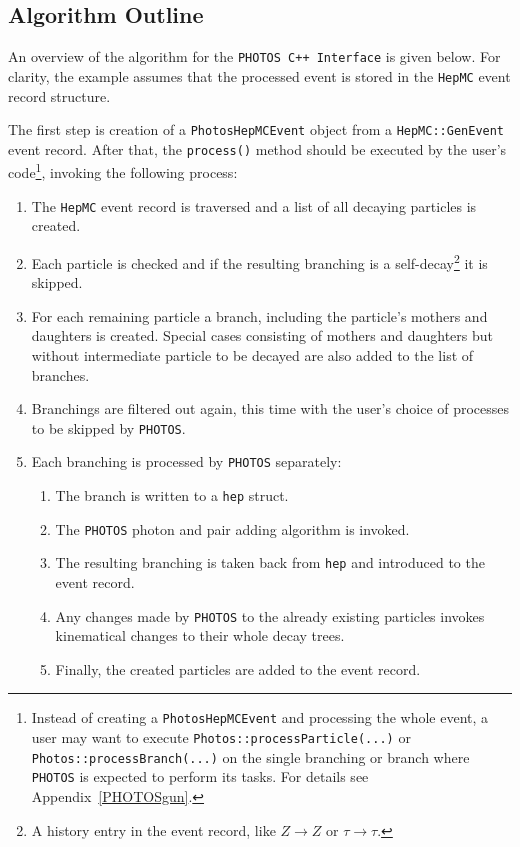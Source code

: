 \documentclass[]{Photos_interface_design}
\begin{document}
\subsection{Algorithm Outline}
\label{sect:Outline}

An overview of the algorithm for  the {\tt PHOTOS C++ Interface} is
given below. For clarity, the example assumes that the processed event
is stored in the {\tt HepMC} event record structure.

The first step is creation of a {\tt PhotosHepMCEvent} object from
a {\tt HepMC::GenEvent} event record. After that, the {\tt process()} method should
be executed by the user's code\footnote{Instead of creating a {\tt PhotosHepMCEvent} and processing the whole event,
a user may want to execute {\tt Photos::processParticle(...)} or {\tt Photos::processBranch(...)}
on the single branching  or branch where {\tt PHOTOS} is expected to perform its tasks.
For details see Appendix~\ref{PHOTOSgun}.
}, invoking the following process:

\begin{enumerate}
\item The {\tt HepMC} event record is traversed and a list of all decaying
      particles is created.
\item Each particle is checked and if the resulting branching is a self-decay\footnote{A history entry in the event record, like
      $Z\to Z$ or $\tau \to \tau$.} it is skipped.
\item For each remaining particle a branch,  including the particle's mothers and daughters
      is created. Special cases consisting of mothers and daughters but without  intermediate particle 
to be decayed are also added to the 
	  list of branches.
\item Branchings are filtered out again, this time with  the user's choice of processes
      to be skipped by {\tt PHOTOS}.
\item Each branching is processed by {\tt PHOTOS} separately:

	\begin{enumerate}
  
	\item The branch is written to a {\tt hep} struct.
	\item The {\tt PHOTOS} photon and pair adding algorithm is invoked. 
	\item The resulting branching is taken back from {\tt hep} and introduced to the event record.
	\item Any changes made by {\tt PHOTOS} to the already existing particles
          invokes kinematical changes to their whole decay trees.
	\item Finally, the created particles are added to the event record.
	\end{enumerate}

\end{enumerate}
\end{document}
